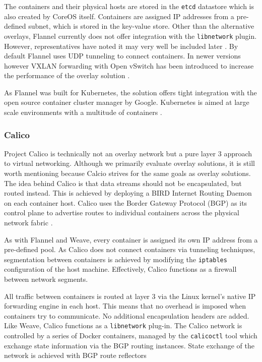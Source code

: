 The containers and their physical hosts are stored in the \texttt{etcd} datastore which is also created by CoreOS itself. Containers are assigned IP addresses from a pre-defined subnet, which is stored in the key-value store. Other than the alternative overlays, Flannel currently does not offer integration with the \texttt{libnetwork} plugin. However, representatives have noted it may very well be included later \cite{newsgroups_2015}. By default Flannel uses UDP tunneling to connect containers. In newer versions however VXLAN forwarding with Open vSwitch has been introduced to increase the performance of the overlay solution \cite{flannel_2015}.

As Flannel was built for Kubernetes, the solution  offers tight integration with the open source container cluster manager by Google. Kubernetes is aimed at large scale environments with a multitude of containers \cite{1_yakubovich_2014}.

\subsubsection{Calico}
Project Calico is technically not an overlay network but a pure layer 3 approach to virtual networking. Although we primarily evaluate overlay solutions, it is still worth mentioning because Calcio strives for the same goals as overlay solutions. The idea behind Calico is that data streams should not be encapsulated, but routed instead. This is achieved by deploying a BIRD Internet Routing Daemon on each container host. Calico uses the Border Gateway Protocol (BGP) as its control plane to advertise routes to individual containers across the physical network fabric \cite{calicosource}.

As with Flannel and Weave, every container is assigned its own IP address from a pre-defined pool. As Calico does not connect containers via tunneling techniques, segmentation between containers is achieved by modifying the \texttt{iptables} configuration of the host machine. Effectively, Calico functions as a firewall between network segments.

All traffic between containers is routed at layer 3 via the Linux kernel’s native IP forwarding engine in each host. This means that no overhead is imposed when containers try to communicate. No additional encapsulation headers are added. Like Weave, Calico functions as a \texttt{libnetwork} plug-in. The Calico network is controlled by a series of Docker containers, managed by the \texttt{calicoctl} tool which exchange state information via the BGP routing instances. State exchange of the network is achieved with BGP route reflectors

